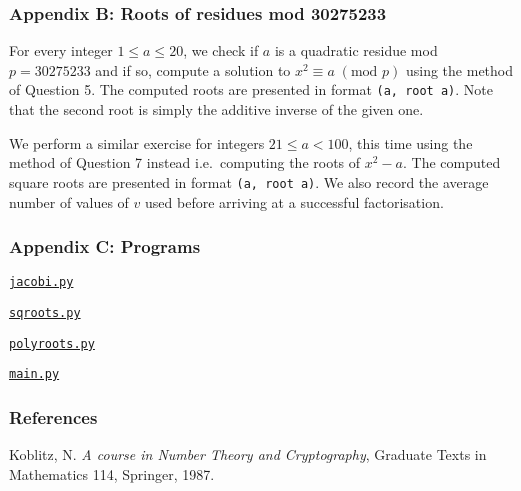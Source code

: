 \documentclass[12pt]{article}
\newcommand{\textmod}[1]{\;(\text{mod }#1)}
\begin{document}
\subsubsection*{Appendix B: Roots of residues mod 30275233}
For every integer \(1\leq a\leq 20\), we check if \(a\) is a quadratic residue
mod \(p=30275233\) and if so, compute a solution to \(x^2\equiv a\textmod{p}\)
using the method of Question 5.
The computed roots are presented in format \texttt{(a, root a)}. Note that the second root is simply the additive inverse of the given one.

 

We perform a similar exercise for integers \(21 \leq a < 100\), this time
using the method of Question 7 instead i.e.\ computing the roots of \(x^2-a\). 
The computed square roots are presented in format \texttt{(a, root a)}. We also
record the average number of values of \(v\) used before arriving at a
successful factorisation.

 

\pagebreak

\subsubsection*{Appendix C: Programs}

\underline{\texttt{jacobi.py}}


\underline{\texttt{sqroots.py}}


\underline{\texttt{polyroots.py}}


\underline{\texttt{main.py}}



\subsubsection*{References}
\begin{enumerate}[{[}1{]}]
    \item Koblitz, N. \textit{A course in Number Theory and Cryptography},
        Graduate Texts in Mathematics 114, Springer, 1987.
\end{enumerate}
\end{document}
